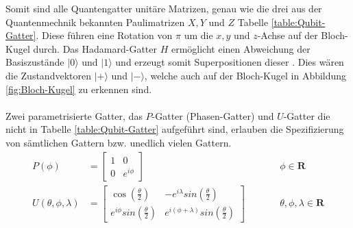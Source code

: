 Somit sind alle Quantengatter unit\"are Matrizen, genau wie die drei aus der Quantenmechnik bekannten Paulimatrizen $X, Y$ und $Z$ Tabelle \ref{table:Qubit-Gatter}. Diese f\"uhren eine Rotation von $\pi$ um die $x, y$ und $z$-Achse auf der Bloch-Kugel durch. Das Hadamard-Gatter $H$ erm\"oglicht einen Abweichung der Basiszust\"ande $|0\rangle$ und $|1\rangle$ und erzeugt somit Superpositionen dieser \cite{Qiskit-Textbook}.
Dies w\"aren die Zustandvektoren $|+\rangle$ und $|-\rangle$, welche auch auf der Bloch-Kugel in Abbildung \ref{fig:Bloch-Kugel} zu erkennen sind. \\ \\
Zwei parametrisierte Gatter, das $P$-Gatter (Phasen-Gatter) und $U$-Gatter die nicht in Tabelle \ref{table:Qubit-Gatter} aufgef\"uhrt sind, erlauben die Spezifizierung von s\"amtlichen Gattern bzw. unedlich vielen Gattern.
\begin{equation}
\begin{aligned}
P(\phi) &= \begin{bmatrix}1 & 0 \\ 0 & e^{i\phi} \end{bmatrix} &&\qquad \phi \in \mathbf{R}\\[1em]
U(\theta, \phi, \lambda) &= \begin{bmatrix} \cos\left(\frac{\theta}{2}\right) & -e^{i\lambda}sin\left(\frac{\theta}{2}\right) \\
e^{i\phi}sin\left(\frac{\theta}{2}\right) & e^{i(\phi+\lambda)}sin\left(\frac{\theta}{2}\right)
\end{bmatrix} &&\qquad \theta, \phi, \lambda \in \mathbf{R}
\end{aligned}
\end{equation}

\vspace{1.2cm}

